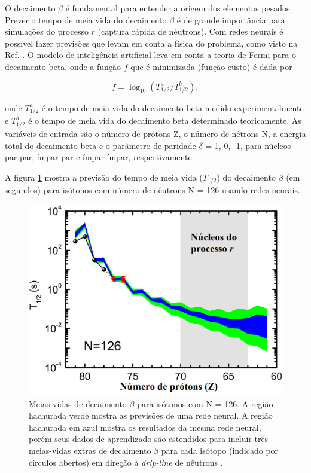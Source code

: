 \documentclass[a4paper,12pt,oneside]{book}
\begin{document}
\begin{appendices}
\par O decaimento $\beta$ é fundamental para entender a origem dos elementos pesados. Prever o tempo de meia vida do decaimento $\beta$ é de grande importância para simulações do processo $r$ (captura rápida de nêutrons). Com redes neurais é possível fazer previsões que levam em conta a física do problema, como visto na Ref. \cite{mlbetadecay}. O modelo de inteligência artificial leva em conta a teoria de Fermi para o decaimento beta, onde a função $f$ que é minimizada (função custo) é dada por

\begin{equation}\label{eq:half_life}
    f = \log_{10}(T^{a}_{1/2}/T^{b}_{1/2}),
\end{equation}

onde $T^{a}_{1/2}$ é o tempo de meia vida do decaimento beta medido experimentalmente e $T^{b}_{1/2}$ é o tempo de meia vida do decaimento beta determinado teoricamente. As variáveis de entrada são o número de prótons Z, o número de nêtrons N, a energia total do decaimento beta e o parâmetro de paridade $\delta$ = 1, 0, -1, para núcleos par-par, ímpar-par e ímpar-ímpar, respectivamente.

\par A figura \ref{fig:beta_decay} mostra a previsão do tempo de meia vida ($T_{1/2}$) do decaimento $\beta$ (em segundos) para isótonos com número de nêutrons N = 126 usando redes neurais.

\begin{figure}[H]
    \centering
    \includegraphics[scale = 0.35]{figs/beta_predict_2.png}
    \caption{Meias-vidas de decaimento $\beta$ para isótonos com N = 126. A região hachurada verde mostra as previsões de uma rede neural. A região hachurada em azul mostra os resultados da mesma rede neural, porém seus dados de aprendizado são estendidos para incluir três meias-vidas extras de decaimento $\beta$ para cada isótopo (indicado por círculos abertos) em direção à \textit{drip-line} de nêutrons \cite{mlbetadecay}.}
    \label{fig:beta_decay}
\end{figure}


\end{appendices}
\end{document}
